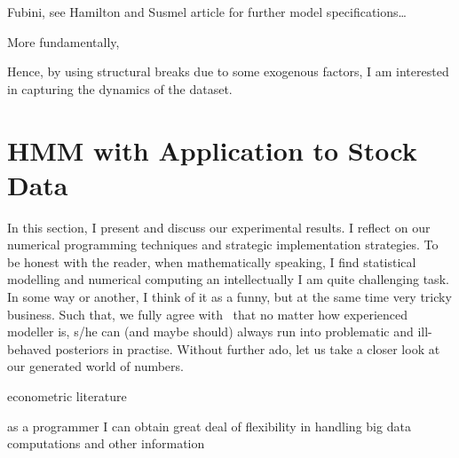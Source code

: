 \documentclass[a4paper,11pt,english]{article}
\begin{document}
		Fubini, see Hamilton and Susmel article for further model specifications\ldots
			
		More fundamentally,	
		
		Hence, by using structural breaks due to some exogenous factors, I am interested in capturing the dynamics of the dataset.	
			
			

	\section{HMM with Application to Stock Data}

		In this section, I present and discuss our experimental results. I reflect on our numerical programming techniques and strategic implementation 
		strategies. To be honest with the reader, when mathematically speaking, I find statistical modelling and numerical computing an intellectually 	
		I am quite challenging task. In some way or another, I think of it as a funny, but at the same time very tricky business. Such that, we fully agree 
		with~\citep[p. 177]{stan} that no matter how experienced modeller is, s/he can (and maybe should) always run into problematic and ill-behaved 
		posteriors in practise. Without further ado, let us take a closer look at our generated world of numbers.   

		
		econometric literature
		
		as a programmer I can obtain great deal of flexibility in handling big data computations and other information
		
\end{document}
